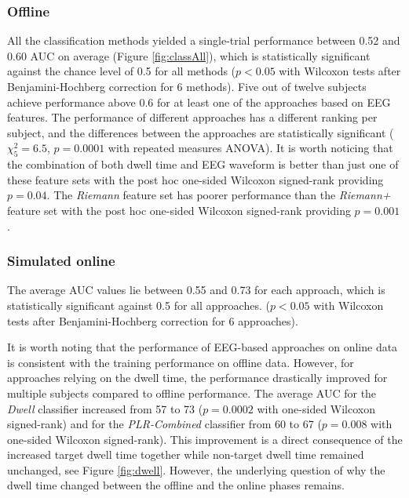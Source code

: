 \documentclass[12pt]{iopart}
\begin{document}
\subsubsection*{Offline}
All the classification methods yielded a single-trial 
performance between 0.52 and 0.60 AUC on average
(Figure \ref{fig:classAll}),
which is statistically significant against the chance level of 0.5 
for all methods
($p < 0.05$ with Wilcoxon tests after Benjamini-Hochberg correction
for 6 methods).
Five out of twelve subjects achieve performance 
above 0.6 for at least one of the approaches based
on EEG features.
The performance of different approaches has a different ranking per subject,
and the differences between
the approaches are statistically significant ($\chi^2_5 = 6.5$, $p = 0.0001$ with repeated measures ANOVA).
It is worth noticing that the combination of both dwell time and EEG waveform is
better than just one of these feature sets with the post hoc 
one-sided Wilcoxon signed-rank providing $p = 0.04$.
The \textit{Riemann} feature set has poorer performance than the \textit{Riemann+}
feature set with the post hoc
one-sided Wilcoxon signed-rank providing $p = 0.001$.

\subsubsection*{Simulated online}
The average AUC values lie between 0.55 and 0.73 for each approach,
which is statistically significant against 0.5
for all approaches.
($p < 0.05$ with Wilcoxon tests after Benjamini-Hochberg correction 
for 6 approaches).

It is worth noting that the performance of EEG-based approaches
on online data is consistent with the training performance on offline data.
However, for approaches relying on the dwell time, the performance drastically improved
for multiple subjects compared to offline performance.
The average AUC for the \textit{Dwell} classifier increased
from 57 to 73 ($p = 0.0002$ with one-sided Wilcoxon signed-rank) and for 
the \textit{PLR-Combined} classifier from 60 to 67 ($p = 0.008$ with one-sided Wilcoxon signed-rank).
This improvement is a direct consequence of the increased target dwell time
together while non-target dwell time remained unchanged, see Figure \ref{fig:dwell}.
However, the underlying question of why the dwell time changed 
between the offline and the online phases remains.
\end{document}

